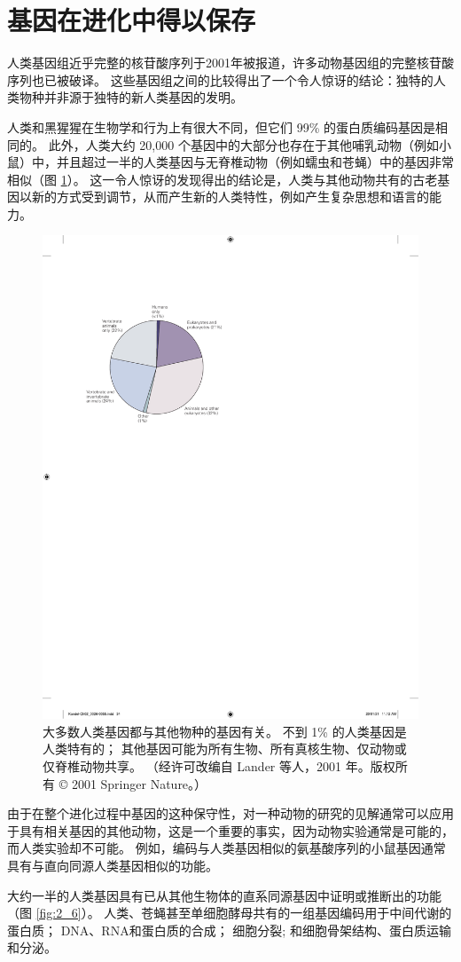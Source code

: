 \section{基因在进化中得以保存}

人类基因组近乎完整的核苷酸序列于2001年被报道，许多动物基因组的完整核苷酸序列也已被破译。 
这些基因组之间的比较得出了一个令人惊讶的结论：独特的人类物种并非源于独特的新人类基因的发明。


人类和黑猩猩在生物学和行为上有很大不同，但它们 99\% 的蛋白质编码基因是相同的。 
此外，人类大约 20,000 个基因中的大部分也存在于其他哺乳动物（例如小鼠）中，并且超过一半的人类基因与无脊椎动物（例如蠕虫和苍蝇）中的基因非常相似（图 \ref{fig:2_5}）。 
这一令人惊讶的发现得出的结论是，人类与其他动物共有的古老基因以新的方式受到调节，从而产生新的人类特性，例如产生复杂思想和语言的能力。

\begin{figure}[htbp]
	\centering
	\includegraphics[width=0.5\linewidth]{chap02/fig_2_5}
	\caption{大多数人类基因都与其他物种的基因有关。
		不到 1\% 的人类基因是人类特有的； 其他基因可能为所有生物、所有真核生物、仅动物或仅脊椎动物共享。 
		（经许可改编自 Lander 等人，2001 年。版权所有 © 2001 Springer Nature。）}
	\label{fig:2_5}
\end{figure}

由于在整个进化过程中基因的这种保守性，对一种动物的研究的见解通常可以应用于具有相关基因的其他动物，这是一个重要的事实，因为动物实验通常是可能的，而人类实验却不可能。 
例如，编码与人类基因相似的氨基酸序列的小鼠基因通常具有与直向同源人类基因相似的功能。


大约一半的人类基因具有已从其他生物体的直系同源基因中证明或推断出的功能（图 \ref{fig:2_6}）。 
人类、苍蝇甚至单细胞酵母共有的一组基因编码用于中间代谢的蛋白质； 
DNA、RNA和蛋白质的合成； 
细胞分裂; 和细胞骨架结构、蛋白质运输和分泌。

